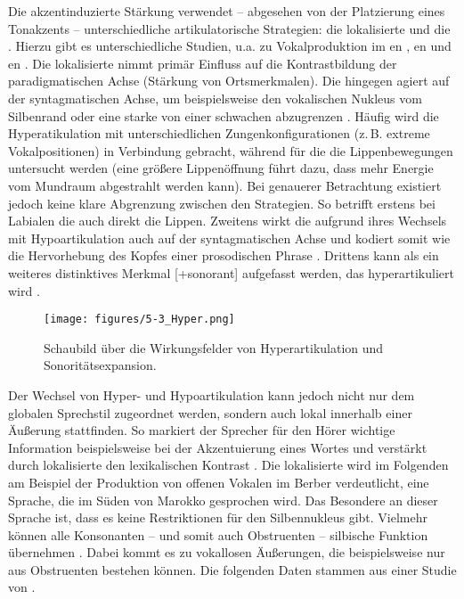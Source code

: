 Die akzentinduzierte Stärkung verwendet -- abgesehen von der Platzierung eines Tonakzents -- unterschiedliche artikulatorische Strategien: die lokalisierte  und die . Hierzu gibt es unterschiedliche Studien, u.a. zu Vokalproduktion im en
\citep[vgl.][]{Beckman1992,DeJong1993,Harrington2000,Erickson2002,Cho2005a}, 
en \citep{Avesani2007} und 
en \citep{Dohen2006}. Die lokalisierte  nimmt primär Einfluss auf die Kontrastbildung der paradigmatischen Achse (Stärkung von Ortsmerkmalen). Die  hingegen agiert auf der syntagmatischen Achse, um beispielsweise den vokalischen Nukleus vom Silbenrand oder eine starke von einer schwachen  abzugrenzen \citep[Stärkung der intrinsischen , vgl.][]{DeJong1993,Harrington2000}. Häufig wird die Hyperatikulation mit unterschiedlichen Zungenkonfigurationen (z.\,B. extreme Vokalpositionen) in Verbindung gebracht, während für die  die Lippenbewegungen untersucht werden (eine größere Lippenöffnung führt dazu, dass mehr Energie vom Mundraum abgestrahlt werden kann). Bei genauerer Betrachtung existiert jedoch keine klare Abgrenzung zwischen den Strategien. So betrifft erstens bei Labialen die  auch direkt die Lippen. Zweitens wirkt die  aufgrund ihres Wechsels mit Hypoartikulation auch auf der syntagmatischen Achse und kodiert somit  wie die Hervorhebung des Kopfes einer prosodischen Phrase \citep{Dohen2006}. Drittens kann  als ein weiteres distinktives Merkmal [+sonorant] aufgefasst werden, das hyperartikuliert wird \citep[vgl.][]{DeJong1995,Harrington2000,Cho2005a}. 

\begin{figure}[hptb]
	\texttt{[image: figures/5-3\_Hyper.png]}
	\caption{Schaubild über die Wirkungsfelder von Hyperartikulation und Sonoritätsexpansion.}
	\label{figure:0503}
\end{figure}

Der Wechsel von Hyper- und Hypoartikulation kann jedoch nicht nur dem globalen Sprechstil zugeordnet werden, sondern auch lokal innerhalb einer Äußerung stattfinden. So markiert der Sprecher für den Hörer wichtige Information beispielsweise bei der Akzentuierung eines Wortes und verstärkt durch lokalisierte  den lexikalischen Kontrast \citep{DeJong1993,DeJong1995}. Die lokalisierte  wird im Folgenden am Beispiel der Produktion von offenen Vokalen im  Berber verdeutlicht, eine Sprache, die im Süden von Marokko gesprochen wird. Das Besondere an dieser Sprache ist, dass es keine Restriktionen für den Silbennukleus gibt. Vielmehr können alle Konsonanten -- und somit auch Obstruenten -- silbische Funktion übernehmen \citep[vgl.][]{Dell1985, Ridouane2008, Hermes2011a}. Dabei kommt es zu vokallosen Äußerungen, die beispielsweise nur aus Obstruenten bestehen können. Die folgenden Daten stammen aus einer Studie von \citet{Diercks2011}.

